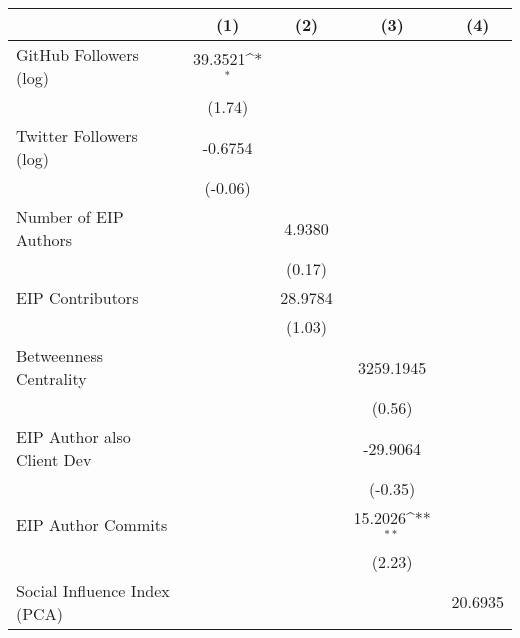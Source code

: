 {
\def\sym#1{\ifmmode^{#1}\else\(^{#1}\)\fi}
\begin{tabular}{l*{4}{c}}
\hline\hline
                                   &\multicolumn{1}{c}{(1)}         &\multicolumn{1}{c}{(2)}         &\multicolumn{1}{c}{(3)}         &\multicolumn{1}{c}{(4)}         \\
\hline
GitHub Followers (log)             &   39.3521\sym{*}  &                   &                   &                   \\
                                   &    (1.74)         &                   &                   &                   \\
[1em]
Twitter Followers (log)            &   -0.6754         &                   &                   &                   \\
                                   &   (-0.06)         &                   &                   &                   \\
[1em]
Number of EIP Authors              &                   &    4.9380         &                   &                   \\
                                   &                   &    (0.17)         &                   &                   \\
[1em]
EIP Contributors                   &                   &   28.9784         &                   &                   \\
                                   &                   &    (1.03)         &                   &                   \\
[1em]
Betweenness Centrality             &                   &                   & 3259.1945         &                   \\
                                   &                   &                   &    (0.56)         &                   \\
[1em]
EIP Author also Client Dev         &                   &                   &  -29.9064         &                   \\
                                   &                   &                   &   (-0.35)         &                   \\
[1em]
EIP Author Commits                 &                   &                   &   15.2026\sym{**} &                   \\
                                   &                   &                   &    (2.23)         &                   \\
[1em]
Social Influence Index (PCA)       &                   &                   &                   &   20.6935         \\

\end{tabular}}
